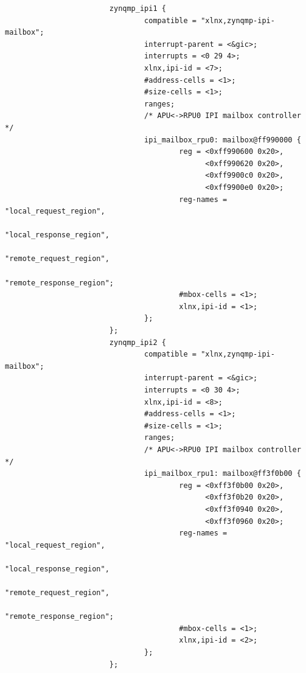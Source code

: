 \documentclass[10pt]{article}
\begin{document}
\begin{verbatim}
                        zynqmp_ipi1 {
                                compatible = "xlnx,zynqmp-ipi-mailbox";
                                interrupt-parent = <&gic>;
                                interrupts = <0 29 4>;
                                xlnx,ipi-id = <7>;
                                #address-cells = <1>;
                                #size-cells = <1>;
                                ranges;
                                /* APU<->RPU0 IPI mailbox controller */
                                ipi_mailbox_rpu0: mailbox@ff990000 {
                                        reg = <0xff990600 0x20>,
                                              <0xff990620 0x20>,
                                              <0xff9900c0 0x20>,
                                              <0xff9900e0 0x20>;
                                        reg-names = "local_request_region",
                                                    "local_response_region",
                                                    "remote_request_region",
                                                    "remote_response_region";
                                        #mbox-cells = <1>;
                                        xlnx,ipi-id = <1>;
                                };
                        };
                        zynqmp_ipi2 {
                                compatible = "xlnx,zynqmp-ipi-mailbox";
                                interrupt-parent = <&gic>;
                                interrupts = <0 30 4>;
                                xlnx,ipi-id = <8>;
                                #address-cells = <1>;
                                #size-cells = <1>;
                                ranges;
                                /* APU<->RPU0 IPI mailbox controller */
                                ipi_mailbox_rpu1: mailbox@ff3f0b00 {
                                        reg = <0xff3f0b00 0x20>,
                                              <0xff3f0b20 0x20>,
                                              <0xff3f0940 0x20>,
                                              <0xff3f0960 0x20>;
                                        reg-names = "local_request_region",
                                                    "local_response_region",
                                                    "remote_request_region",
                                                    "remote_response_region";
                                        #mbox-cells = <1>;
                                        xlnx,ipi-id = <2>;
                                };
                        };


\end{verbatim}
\end{document}
